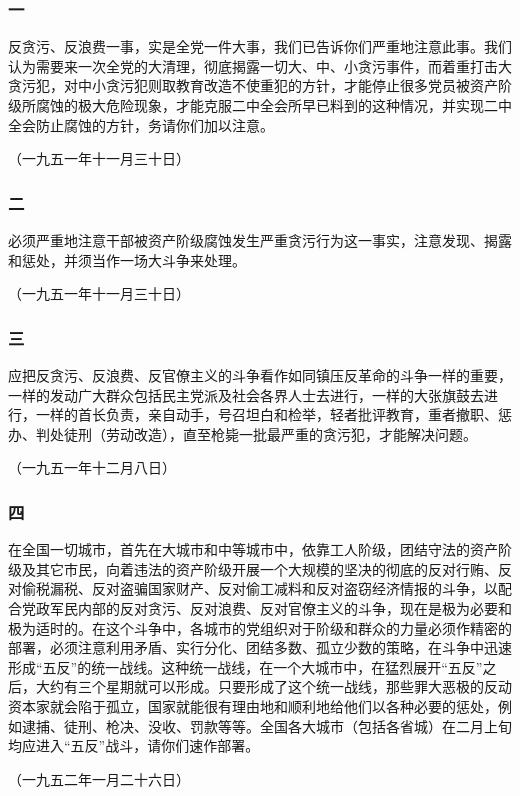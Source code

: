 \documentclass[cn,11pt,chinese]{elegantbook}
\def\myformat#1{\hfil\hfil #1}
\begin{document}
\subsubsection*{\myformat{一}}
反贪污、反浪费一事，实是全党一件大事，我们已告诉你们严重地注意此事。我们认为需要来一次全党的大清理，彻底揭露一切大、中、小贪污事件，而着重打击大贪污犯，对中小贪污犯则取教育改造不使重犯的方针，才能停止很多党员被资产阶级所腐蚀的极大危险现象，才能克服二中全会所早已料到的这种情况，并实现二中全会防止腐蚀的方针，务请你们加以注意。\\
\begin{flushright}
（一九五一年十一月三十日）
\end{flushright}
\subsubsection*{\myformat{二}}
必须严重地注意干部被资产阶级腐蚀发生严重贪污行为这一事实，注意发现、揭露和惩处，并须当作一场大斗争来处理。\\
\begin{flushright}
（一九五一年十一月三十日）
\end{flushright}
\subsubsection*{\myformat{三}}
应把反贪污、反浪费、反官僚主义的斗争看作如同镇压反革命的斗争一样的重要，一样的发动广大群众包括民主党派及社会各界人士去进行，一样的大张旗鼓去进行，一样的首长负责，亲自动手，号召坦白和检举，轻者批评教育，重者撤职、惩办、判处徒刑（劳动改造），直至枪毙一批最严重的贪污犯，才能解决问题。\\
\begin{flushright}
（一九五一年十二月八日）
\end{flushright}
\subsubsection*{\myformat{四}}
在全国一切城市，首先在大城市和中等城市中，依靠工人阶级，团结守法的资产阶级及其它市民，向着违法的资产阶级开展一个大规模的坚决的彻底的反对行贿、反对偷税漏税、反对盗骗国家财产、反对偷工减料和反对盗窃经济情报的斗争，以配合党政军民内部的反对贪污、反对浪费、反对官僚主义的斗争，现在是极为必要和极为适时的。在这个斗争中，各城市的党组织对于阶级和群众的力量必须作精密的部署，必须注意利用矛盾、实行分化、团结多数、孤立少数的策略，在斗争中迅速形成“五反”的统一战线。这种统一战线，在一个大城市中，在猛烈展开“五反”之后，大约有三个星期就可以形成。只要形成了这个统一战线，那些罪大恶极的反动资本家就会陷于孤立，国家就能很有理由地和顺利地给他们以各种必要的惩处，例如逮捕、徒刑、枪决、没收、罚款等等。全国各大城市（包括各省城）在二月上旬均应进入“五反”战斗，请你们速作部署。\\
\begin{flushright}
（一九五二年一月二十六日）
\end{flushright}
\end{document}
